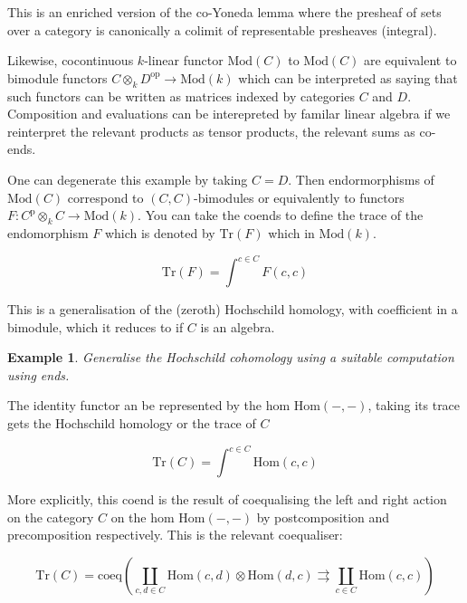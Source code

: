 \documentclass{tufte-book}
\newtheorem{example}[theorem]{Example}
\begin{document}
This is an enriched version of the co-Yoneda lemma where the presheaf of sets over a category is canonically a colimit of representable presheaves (integral).

Likewise, cocontinuous $k$-linear functor $\mathrm{Mod}(C)$ to $\mathrm{Mod}(C)$ are equivalent to bimodule functors $C \otimes_k D^\mathrm{op} \rightarrow \mathrm{Mod}(k)$ which can be interpreted as saying that such functors can be written as matrices indexed by categories $C$ and $D$. Composition and evaluations can be interepreted by familar linear algebra if we reinterpret the relevant products as tensor products, the relevant sums as co-ends.

One can degenerate this example by taking $C = D$. Then endormorphisms of $\mathrm{Mod}(C)$ correspond to $(C,C)$-bimodules or equivalently to functors $F : C^\mathrm{p} \otimes_k C \rightarrow \mathrm{Mod}(k)$. You can take the coends to define the trace of the endomorphism $F$ which is denoted by $\mathrm{Tr}(F)$ which in $\mathrm{Mod}(k)$.

\begin{equation}
	\mathrm{Tr}(F) = \int^{c \in C}
	F(c,c)
\end{equation}

This is a generalisation of the (zeroth) Hochschild homology, with coefficient in a bimodule, which it reduces to if $C$ is an algebra.

\begin{example}
	Generalise the Hochschild cohomology using a suitable computation using ends.
\end{example}

The identity functor an be represented by the hom $\mathrm{Hom(-,-)}$, taking its trace gets the Hochschild homology or the trace of $C$

\begin{equation}
	\mathrm{Tr}(C) = \int^{c \in C}
	\mathrm{Hom}(c,c)
\end{equation}

More explicitly, this coend is the result of coequalising the left and right action on the category $C$ on the hom $\mathrm{Hom(-,-)}$ by postcomposition and precomposition respectively. This is the relevant coequaliser:

\begin{equation}
	\mathrm{Tr}(C) = \mathrm{coeq}
	\left(
		\coprod_{c, d \in C} \mathrm{Hom}(c,d)
		\otimes
		\mathrm{Hom}(d,c)
		\rightrightarrows 
		\coprod_{c \in C}
		\mathrm{Hom}(c,c)
	\right)
\end{equation}
\end{document}
